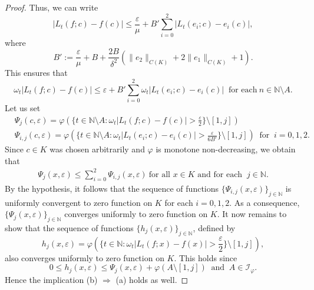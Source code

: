 \documentclass[10pt,a4paper]{amsart}
\begin{document}
\begin{proof}
Thus, we can write
\begin{equation*}
	|L_t(f; c) - f(c)| \leq \frac{\varepsilon}{\mu} + B' \sum_{i=0}^2 |L_t(e_i; c) - e_i(c)|, 
\end{equation*}
where
\[
B' := \frac{\varepsilon}{\mu} + B + \frac{2B}{\delta^2} \left( \|e_2\|_{C(K)} + 2\|e_1\|_{C(K)} + 1 \right).
\]
This ensures that
$$
\omega_t |L_t(f; c) - f(c)| \leq \varepsilon + B' \sum_{i=0}^2 \omega_t|L_t(e_i; c) - e_i(c)|~\mbox{ for each}~n\in\mathbb{N}\setminus A. 
$$
Let us set 
\begin{align*}
&\Psi_j(c,\varepsilon)=\varphi(\{t\in\mathbb{N}\setminus A:\omega_t |L_t(f; c) - f(c)|>\frac{\varepsilon}{2}\}\setminus [1,j])\\
&\Psi_{i,j}(c,\varepsilon)=\varphi(\{t\in\mathbb{N}\setminus A:\omega_t |L_t(e_i; c) - e_i(c)|>\frac{\varepsilon}{6B'}\}\setminus [1,j])~\mbox{ for }~i=0,1,2.
\end{align*}
Since $c\in K$ was chosen arbitrarily and  $\varphi$  is monotone non-decreasing, we obtain that
\begin{align*}
\Psi_j(x,\varepsilon)\leq \displaystyle \sum_{i=0}^{2}\Psi_{i,j}(x,\varepsilon)~\mbox{for all $x\in K$ and for each }~j\in\mathbb{N}.
\end{align*}
By the hypothesis, it follows that the sequence of functions $\{\Psi_{i,j}(x,\varepsilon)\}_{j\in\mathbb{N}}$ is uniformly convergent to zero function on $K$ for each $i=0,1,2$. As a consequence, $\{\Psi_j(x,\varepsilon)\}_{j\in\mathbb{N}}$ converges uniformly to zero function on $K$. It now remains to show that the sequence of functions $\{h_j(x,\varepsilon)\}_{j\in\mathbb{N}}$, defined by 
$$
h_j(x,\varepsilon)=\varphi(\{t\in\mathbb{N}:\omega_t |L_t(f; x) - f(x)|>\frac{\varepsilon}{2}\}\setminus [1,j]),
$$
also converges uniformly to zero function on $K$. This holds since
$$
0\leq h_j(x,\varepsilon)\leq \Psi_j(x,\varepsilon)+\varphi(A\setminus [1,j])~\mbox{ and }~A\in\mathcal{I}_{\varphi}.
$$
Hence the implication (b) $\Rightarrow$ (a) holds as well.
\end{proof}
\end{document}
